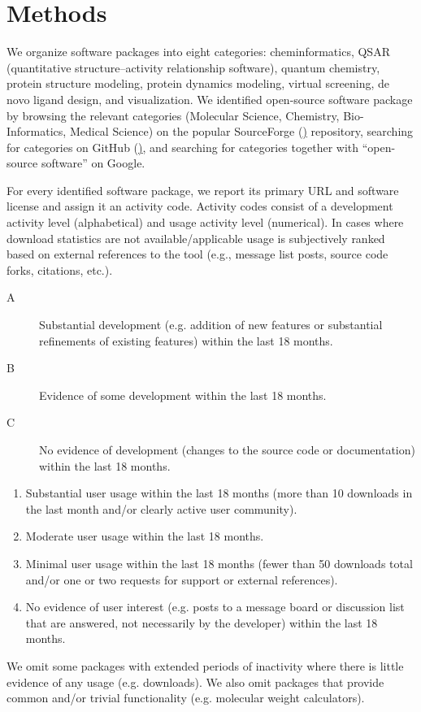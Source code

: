 \section{Methods}

We organize software packages into eight categories: cheminformatics, QSAR (quantitative structure–activity relationship software), quantum chemistry, protein structure modeling, protein dynamics modeling, virtual screening, de novo ligand design, and visualization.
We identified open-source software package by browsing the relevant categories (Molecular Science, Chemistry, Bio-Informatics, Medical Science) on the popular SourceForge (\href{http://sourceforge.net}) repository, searching for categories on GitHub (\href{http://github.com}), and searching for categories together with ``open-source software'' on Google.

For every identified software package, we report its primary URL and software license and assign it an activity code. Activity codes consist of a development activity level (alphabetical) and usage activity level (numerical). In cases where download statistics are not available/applicable usage is subjectively ranked based on external references to the tool (e.g., message list posts, source code forks, citations, etc.).
\begin{description}
  \item[A] Substantial development (e.g. addition of new features or substantial refinements of existing features) within the last 18 months.
  \item[B] Evidence of some development within the last 18 months.
  \item[C] No evidence of development (changes to the source code or documentation) within the last 18 months.
\end{description}
\begin{enumerate}
  \item Substantial user usage within the last 18 months (more than 10 downloads in the last month and/or clearly active user community).
  \item Moderate user usage within the last 18 months.
    \item Minimal user usage within the last 18 months (fewer than 50 downloads total and/or one or two requests for support or external references).
  \item No evidence of user interest (e.g. posts to a message board or discussion list that are answered, not necessarily by the developer) within the last 18 months.
\end{enumerate}

We omit some packages with extended periods of inactivity where there is little evidence of any usage (e.g. downloads).  We also omit packages that provide common and/or trivial functionality (e.g. molecular weight calculators).



 
 

  
  